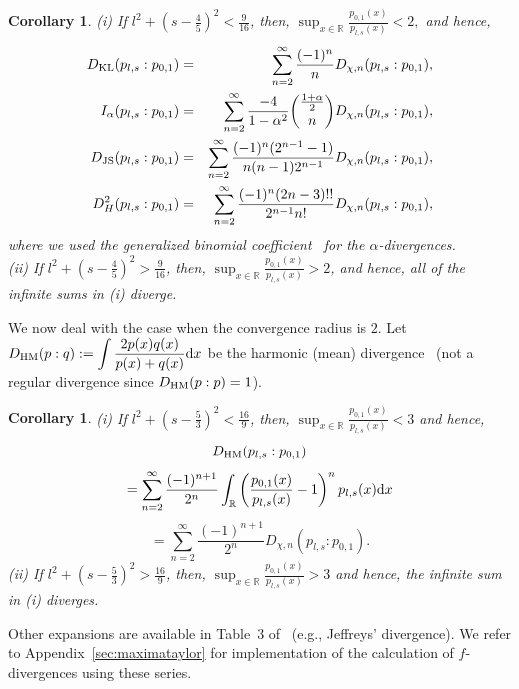 \documentclass[journal]{IEEEtran}
\newtheorem{corollary}[theorem]{Corollary}
\begin{document}
\begin{corollary}
(i) If $\displaystyle l^2 + \left(s - \frac{4}{5}\right)^2 < \frac{9}{16}$, 
then, $\displaystyle \sup_{x \in \mathbb R} \frac{p_{0,1}(x)}{p_{l,s}(x)} < 2,$ 
and hence, 
\begin{eqnarray*}
D_{\mathrm{KL}}(p_{l, s} : p_{0, 1}) &=& \sum_{n=2}^{\infty} \frac{(-1)^n}{n} D_{\chi,n}(p_{l, s} : p_{0, 1}), \\
 I_{\alpha}(p_{l, s} : p_{0, 1}) &=& \sum_{n=2}^{\infty} \frac{-4}{1-\alpha^2} \binom{\frac{1+\alpha}{2}}{n} D_{\chi,n}(p_{l, s} : p_{0, 1}),\\
 D_{\mathrm{JS}}(p_{l, s} : p_{0, 1}) &=& \sum_{n=2}^{\infty} \frac{(-1)^n (2^{n-1}-1)}{n(n-1)2^{n-1}} D_{\chi,n}(p_{l, s} : p_{0, 1}), \\
D_H^2(p_{l, s} : p_{0, 1}) &=& \sum_{n=2}^{\infty} \frac{(-1)^n (2n-3)!!}{2^{n-1} n!} D_{\chi,n}(p_{l, s} : p_{0, 1}),
\end{eqnarray*}
where we used the generalized binomial coefficient~\cite{graham1989concrete} for the $\alpha$-divergences.\\
(ii) If $\displaystyle l^2 + \left(s - \frac{4}{5}\right)^2 > \frac{9}{16}$, 
then, $\displaystyle \sup_{x \in \mathbb R} \frac{p_{0,1}(x)}{p_{l,s}(x)} > 2$,  
and hence, 
all of the infinite sums in (i) diverge. 
\end{corollary}



We now deal with the case when the convergence radius is $2$. 
Let $\displaystyle D_{\mathrm{HM}}(p:q):=\int \frac{2p(x)q(x)}{p(x)+q(x)} \mathrm{d}x$ be the harmonic (mean) divergence~\cite{HM-2007,dragomir2010refinement} (not a  regular divergence since $D_{\mathrm{HM}}(p:p)=1$). 

\begin{corollary}
(i) If  $\displaystyle l^2 + \left(s - \frac{5}{3}\right)^2 < \frac{16}{9}$, 
then, $\displaystyle \sup_{x \in \mathbb R} \frac{p_{0,1}(x)}{p_{l,s}(x)} < 3$
and hence, 
\[ D_{\mathrm{HM}}(p_{l, s} : p_{0, 1}) \]
\[= \sum_{n=2}^{\infty} \frac{(-1)^{n+1}}{2^n} \int_{\mathbb R} \left( \frac{p_{0,1}(x)}{p_{l,s}(x)} - 1 \right)^n p_{l,s}(x) \mathrm{d}x\]
\[=\sum_{n=2}^{\infty} \frac{(-1)^{n+1}}{2^n} D_{\chi,n}(p_{l, s} : p_{0, 1}). \]
(ii) If $\displaystyle l^2 + \left(s - \frac{5}{3}\right)^2 > \frac{16}{9}$, 
then, $\displaystyle \sup_{x \in \mathbb R} \frac{p_{0,1}(x)}{p_{l,s}(x)} > 3$
and hence, 
the infinite sum in (i) diverges. 
\end{corollary}

Other expansions are available in Table~3 of~\cite{nielsen2019power} (e.g., Jeffreys' divergence).
We refer to Appendix~\ref{sec:maximataylor} for implementation of the calculation of $f$-divergences using these series.
\end{document}
